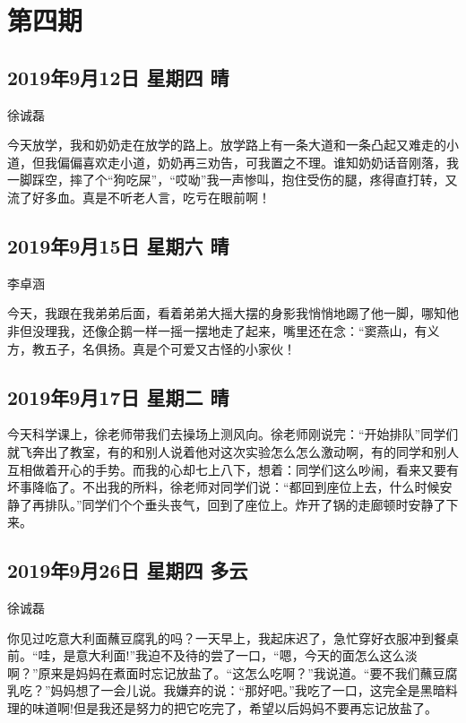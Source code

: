 \chapter{第四期}

\section{2019年9月12日 星期四 晴}

徐诚磊

今天放学，我和奶奶走在放学的路上。放学路上有一条大道和一条凸起又难走的小道，但我偏偏喜欢走小道，奶奶再三劝告，可我置之不理。谁知奶奶话音刚落，我一脚踩空，摔了个``狗吃屎''，``哎呦''我一声惨叫，抱住受伤的腿，疼得直打转，又流了好多血。真是不听老人言，吃亏在眼前啊！

\section{2019年9月15日 星期六 晴}

李卓涵

今天，我跟在我弟弟后面，看着弟弟大摇大摆的身影我悄悄地踢了他一脚，哪知他非但没理我，还像企鹅一样一摇一摆地走了起来，嘴里还在念：``窦燕山，有义方，教五子，名俱扬。真是个可爱又古怪的小家伙！

\section{2019年9月17日 星期二 晴}

今天科学课上，徐老师带我们去操场上测风向。徐老师刚说完：``开始排队''同学们就飞奔出了教室，有的和别人说着他对这次实验怎么怎么激动啊，有的同学和别人互相做着开心的手势。而我的心却七上八下，想着：同学们这么吵闹，看来又要有坏事降临了。不出我的所料，徐老师对同学们说：``都回到座位上去，什么时候安静了再排队。''同学们个个垂头丧气，回到了座位上。炸开了锅的走廊顿时安静了下来。

\section{2019年9月26日 星期四 多云}

徐诚磊

你见过吃意大利面蘸豆腐乳的吗？一天早上，我起床迟了，急忙穿好衣服冲到餐桌前。``哇，是意大利面!''我迫不及待的尝了一口，``嗯，今天的面怎么这么淡啊？''原来是妈妈在煮面时忘记放盐了。``这怎么吃啊？''我说道。``要不我们蘸豆腐乳吃？''妈妈想了一会儿说。我嫌弃的说：``那好吧。''我吃了一口，这完全是黑暗料理的味道啊!但是我还是努力的把它吃完了，希望以后妈妈不要再忘记放盐了。

